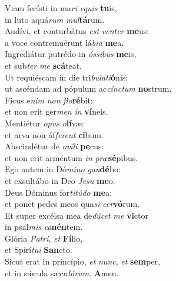 \oddverse Viam fecísti in ma\textit{ri} \textit{e}\textit{quis} \textbf{tu}is,~\*\\
\oddverse in luto aquá\textit{rum} \textit{mul}\textbf{tá}rum.\\
\evenverse Audívi, et conturbátus \textit{est} \textit{ven}\textit{ter} \textbf{me}us:~\*\\
\evenverse a voce contremuérunt lá\textit{bi}\textit{a} \textbf{me}a.\\
\oddverse Ingrediátur putrédo in \textit{ós}\textit{si}\textit{bus} \textbf{me}is,~\*\\
\oddverse et sub\textit{ter} \textit{me} \textbf{scá}teat.\\
\evenverse Ut requiéscam in die tri\textit{bu}\textit{la}\textit{ti}\textbf{ó}nis:~\*\\
\evenverse ut ascéndam ad pópulum ac\textit{cín}\textit{ctum} \textbf{no}strum.\\
\oddverse Ficus e\textit{nim} \textit{non} \textit{flo}\textbf{ré}bit:~\*\\
\oddverse et non erit ger\textit{men} \textit{in} \textbf{ví}neis.\\
\evenverse Mentiétur \textit{o}\textit{pus} \textit{o}\textbf{lí}væ:~\*\\
\evenverse et arva non áf\textit{fe}\textit{rent} \textbf{ci}bum.\\
\oddverse Abscindétur de \textit{o}\textit{ví}\textit{li} \textbf{pe}cus:~\*\\
\oddverse et non erit arméntum \textit{in} \textit{præ}\textbf{sé}pibus.\\
\evenverse Ego autem in Dó\textit{mi}\textit{no} \textit{gau}\textbf{dé}bo:~\*\\
\evenverse et exsultábo in Deo \textit{Je}\textit{su} \textbf{me}o.\\
\oddverse Deus Dóminus for\textit{ti}\textit{tú}\textit{do} \textbf{me}a:~\*\\
\oddverse et ponet pedes meos qua\textit{si} \textit{cer}\textbf{vó}rum.\\
\evenverse Et super excélsa mea de\textit{dú}\textit{cet} \textit{me} \textbf{vi}ctor~\*\\
\evenverse in psal\textit{mis} \textit{ca}\textbf{nén}tem.\\
\oddverse Glória \textit{Pa}\textit{tri}, \textit{et} \textbf{Fí}lio,~\*\\
\oddverse et Spirí\textit{tu}\textit{i} \textbf{San}cto.\\
\evenverse Sicut erat in princípio, \textit{et} \textit{nunc}, \textit{et} \textbf{sem}per,~\*\\
\evenverse et in sǽcula sæcu\textit{ló}\textit{rum}. \textbf{A}men.\\
